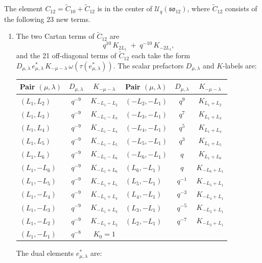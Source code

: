 \documentclass{ximera}
\newcommand{\so}{\mathfrak{so}}
\newcommand{\Uq}{\mathcal{U}_q}
\begin{document}
\begin{theorem}\label{thm:central-element}
The element $C_{12} = \widetilde{C}_{10} + \widetilde{C}_{12}$ is in the center of $\Uq(\so_{12})$, where $\widetilde{C}_{12}$ consists of the following 23 new terms.
\begin{enumerate}
\item The two Cartan terms of $\widetilde{C}_{12}$ are
\[
    q^{10}\, K_{2L_1} \;+\; q^{-10}\, K_{-2L_1},
\]
and the 21 off-diagonal terms of $\widetilde{C}_{12}$ each take the form $D_{\mu,\lambda}\, e^*_{\mu,\lambda}\, K_{-\mu-\lambda}\, \omega(\tau(e^*_{\mu,\lambda}))$. The scalar prefactors $D_{\mu,\lambda}$ and $K$-labels are:
\begin{center}
\begin{tabular}{lcc|lcc}
\hline
Pair $(\mu,\lambda)$ & $D_{\mu,\lambda}$ & $K_{-\mu-\lambda}$ & Pair $(\mu,\lambda)$ & $D_{\mu,\lambda}$ & $K_{-\mu-\lambda}$ \\
\hline
$(L_1, L_2)$ & $q^{-9}$ & $K_{-L_1-L_2}$ & $(-L_2, -L_1)$ & $q^{9}$ & $K_{L_1+L_2}$ \\
$(L_1, L_3)$ & $q^{-9}$ & $K_{-L_1-L_3}$ & $(-L_3, -L_1)$ & $q^{7}$ & $K_{L_1+L_3}$ \\
$(L_1, L_4)$ & $q^{-9}$ & $K_{-L_1-L_4}$ & $(-L_4, -L_1)$ & $q^{5}$ & $K_{L_1+L_4}$ \\
$(L_1, L_5)$ & $q^{-9}$ & $K_{-L_1-L_5}$ & $(-L_5, -L_1)$ & $q^{3}$ & $K_{L_1+L_5}$ \\
$(L_1, L_6)$ & $q^{-9}$ & $K_{-L_1-L_6}$ & $(-L_6, -L_1)$ & $q$ & $K_{L_1+L_6}$ \\
$(L_1, -L_6)$ & $q^{-9}$ & $K_{-L_1+L_6}$ & $(L_6, -L_1)$ & $q$ & $K_{-L_6+L_1}$ \\
$(L_1, -L_5)$ & $q^{-9}$ & $K_{-L_1+L_5}$ & $(L_5, -L_1)$ & $q^{-1}$ & $K_{-L_5+L_1}$ \\
$(L_1, -L_4)$ & $q^{-9}$ & $K_{-L_1+L_4}$ & $(L_4, -L_1)$ & $q^{-3}$ & $K_{-L_4+L_1}$ \\
$(L_1, -L_3)$ & $q^{-9}$ & $K_{-L_1+L_3}$ & $(L_3, -L_1)$ & $q^{-5}$ & $K_{-L_3+L_1}$ \\
$(L_1, -L_2)$ & $q^{-9}$ & $K_{-L_1+L_2}$ & $(L_2, -L_1)$ & $q^{-7}$ & $K_{-L_2+L_1}$ \\
$(L_1, -L_1)$ & $q^{-8}$ & $K_0 = 1$ & & & \\
\hline
\end{tabular}
\end{center}
The dual elements $e^*_{\mu,\lambda}$ are: \footnotesize

\allowdisplaybreaks


\end{enumerate}
\end{theorem}
\end{document}
